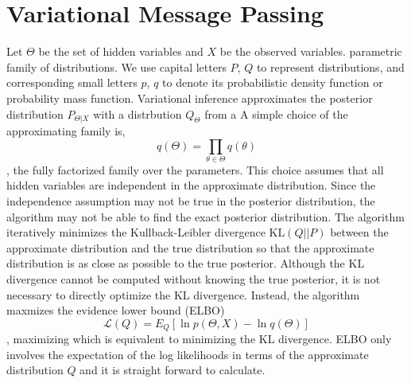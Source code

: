 \section{Variational Message Passing}

Let $\Theta$ be the set of hidden variables and $X$ be the observed variables.
parametric family of distributions. We use capital letters $P$, $Q$ to
represent distributions, and corresponding small letters $p$, $q$ to denote
its probabilistic density function or probability mass function.
Variational inference approximates the posterior distribution
$P_{\Theta|X}$ with a distrbution $Q_{\Theta}$ from a
A simple choice of the
approximating
family is,
\begin{equation*}
	q(\Theta) = \prod_{\theta \in \Theta} q(\theta)
\end{equation*}
, the fully factorized family over the parameters. This choice assumes that
all hidden variables are independent in the approximate distribution. Since
the independence assumption may not be true in the posterior distribution, the
algorithm may not be able to find the exact posterior distribution. The
algorithm iteratively minimizes the Kullback-Leibler divergence
$\mathrm{KL}(Q||P)$ between the approximate distribution and
the true distribution so that the approximate distribution is as close as
possible to the true posterior. Although the KL divergence cannot be computed
without knowing the true posterior, it is not necessary to
directly optimize the KL divergence. Instead, the algorithm maxmizes the
evidence lower bound (ELBO) 
\begin{equation}
	\label{eqn:ELBO}
	\mathcal{L}(Q) = E_Q[\ln p(\Theta, X) - \ln q(\Theta)] 
\end{equation} 
, maximizing which is equivalent to minimizing the KL divergence. ELBO only
involves the expectation of the log likelihoods in terms of the approximate
distribution $Q$ and it is straight forward to calculate. 

